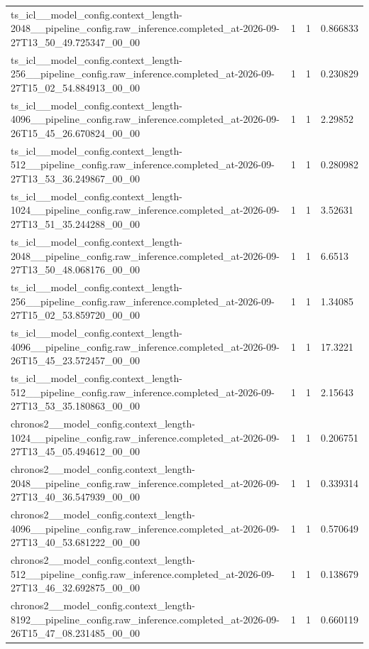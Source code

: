 \begin{tabular}{llll}
ts\_icl\_\_model\_config.context\_length-2048\_\_pipeline\_config.raw\_inference.completed\_at-2026-09-27T13\_50\_49.725347\_00\_00 & 1 & 1 & 0.866833 \\
ts\_icl\_\_model\_config.context\_length-256\_\_pipeline\_config.raw\_inference.completed\_at-2026-09-27T15\_02\_54.884913\_00\_00 & 1 & 1 & 0.230829 \\
ts\_icl\_\_model\_config.context\_length-4096\_\_pipeline\_config.raw\_inference.completed\_at-2026-09-26T15\_45\_26.670824\_00\_00 & 1 & 1 & 2.29852 \\
ts\_icl\_\_model\_config.context\_length-512\_\_pipeline\_config.raw\_inference.completed\_at-2026-09-27T13\_53\_36.249867\_00\_00 & 1 & 1 & 0.280982 \\
ts\_icl\_\_model\_config.context\_length-1024\_\_pipeline\_config.raw\_inference.completed\_at-2026-09-27T13\_51\_35.244288\_00\_00 & 1 & 1 & 3.52631 \\
ts\_icl\_\_model\_config.context\_length-2048\_\_pipeline\_config.raw\_inference.completed\_at-2026-09-27T13\_50\_48.068176\_00\_00 & 1 & 1 & 6.6513 \\
ts\_icl\_\_model\_config.context\_length-256\_\_pipeline\_config.raw\_inference.completed\_at-2026-09-27T15\_02\_53.859720\_00\_00 & 1 & 1 & 1.34085 \\
ts\_icl\_\_model\_config.context\_length-4096\_\_pipeline\_config.raw\_inference.completed\_at-2026-09-26T15\_45\_23.572457\_00\_00 & 1 & 1 & 17.3221 \\
ts\_icl\_\_model\_config.context\_length-512\_\_pipeline\_config.raw\_inference.completed\_at-2026-09-27T13\_53\_35.180863\_00\_00 & 1 & 1 & 2.15643 \\
chronos2\_\_model\_config.context\_length-1024\_\_pipeline\_config.raw\_inference.completed\_at-2026-09-27T13\_45\_05.494612\_00\_00 & 1 & 1 & 0.206751 \\
chronos2\_\_model\_config.context\_length-2048\_\_pipeline\_config.raw\_inference.completed\_at-2026-09-27T13\_40\_36.547939\_00\_00 & 1 & 1 & 0.339314 \\
chronos2\_\_model\_config.context\_length-4096\_\_pipeline\_config.raw\_inference.completed\_at-2026-09-27T13\_40\_53.681222\_00\_00 & 1 & 1 & 0.570649 \\
chronos2\_\_model\_config.context\_length-512\_\_pipeline\_config.raw\_inference.completed\_at-2026-09-27T13\_46\_32.692875\_00\_00 & 1 & 1 & 0.138679 \\
chronos2\_\_model\_config.context\_length-8192\_\_pipeline\_config.raw\_inference.completed\_at-2026-09-26T15\_47\_08.231485\_00\_00 & 1 & 1 & 0.660119 \\

\end{tabular}
